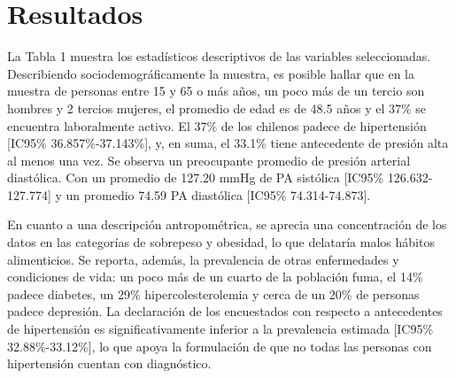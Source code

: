 \documentclass{aa}
\begin{document}
\section{Resultados}

La Tabla 1 muestra los estadísticos descriptivos de las variables seleccionadas. Describiendo sociodemográficamente la muestra, es posible hallar que en la muestra de personas entre 15 y 65 o más años, un poco más de un tercio son hombres y 2 tercios mujeres, el promedio de edad es de 48.5 años y el 37\% se encuentra laboralmente activo. El 37\% de los chilenos padece de hipertensión [IC95\% 36.857\%-37.143\%], y, en suma, el 33.1\% tiene antecedente de presión alta al menos una vez. Se observa un preocupante promedio de presión arterial diastólica. Con un promedio de 127.20 mmHg de PA sistólica [IC95\% 126.632-127.774] y un promedio 74.59 PA diastólica [IC95\% 74.314-74.873]. 

En cuanto a una descripción antropométrica, se aprecia una concentración de los datos en las categorías de sobrepeso y obesidad, lo que delataría malos hábitos alimenticios. Se reporta, además, la prevalencia de otras enfermedades y condiciones de vida: un poco más de un cuarto de la población fuma, el 14\% padece diabetes, un 29\% hipercolesterolemia y cerca de un 20\% de personas padece depresión. La declaración de los encuestados con respecto a antecedentes de hipertensión es significativamente inferior a la prevalencia estimada [IC95\% 32.88\%-33.12\%], lo que apoya la formulación de que no todas las personas con hipertensión cuentan con diagnóstico.
\end{document}

